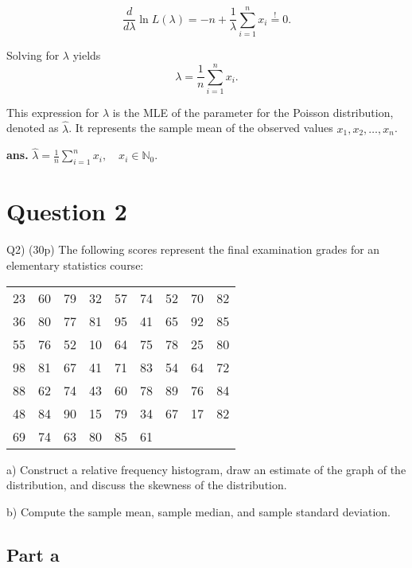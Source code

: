 \documentclass[12pt]{article}
\begin{document}
\[ \frac{d}{d\lambda} \ln L(\lambda) = -n + \frac{1}{\lambda} \sum_{i=1}^n x_i \stackrel{!}{=} 0. \]

Solving for \(\lambda\) yields
\[ \lambda = \frac{1}{n} \sum_{i=1}^n x_i. \]

This expression for \(\lambda\) is the MLE of the parameter for the Poisson distribution, denoted as \(\hat{\lambda}\). It represents the sample mean of the observed values \(x_1, x_2, \ldots, x_n\).
\AnswerTag


\vfill
\begin{flushright}
\textbf{ans.} \(\hat{\lambda} = \frac{1}{n} \sum_{i=1}^n x_i, \quad x_i\in \mathbb{N}_0.\)
\end{flushright}


\newpage
\section*{Question 2}
\begin{q}
Q2) (30p) The following scores represent the final examination grades for an elementary statistics course:

\begin{center}
\begin{tabular}{lllllllll}
23 & 60 & 79 & 32 & 57 & 74 & 52 & 70 & 82 \\
36 & 80 & 77 & 81 & 95 & 41 & 65 & 92 & 85 \\
55 & 76 & 52 & 10 & 64 & 75 & 78 & 25 & 80 \\
98 & 81 & 67 & 41 & 71 & 83 & 54 & 64 & 72 \\
88 & 62 & 74 & 43 & 60 & 78 & 89 & 76 & 84 \\
48 & 84 & 90 & 15 & 79 & 34 & 67 & 17 & 82 \\
69 & 74 & 63 & 80 & 85 & 61 & & &
\end{tabular}
\end{center}

a) Construct a relative frequency histogram, draw an estimate of the graph of the distribution, and discuss the skewness of the distribution.

b) Compute the sample mean, sample median, and sample standard deviation.
\end{q}

\subsection*{Part a}
\end{document}
